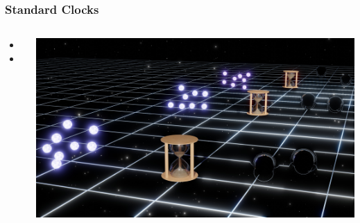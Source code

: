 \documentclass[aspectratio=169]{beamer}
\begin{document}
\begin{frame}
    \frametitle{Standard Clocks}
    \begin{columns}
        \begin{itemize}
            \item <+Cosmic Chronometers+>
            \item <+Pulsar timing arrays+>
        \end{itemize}
        \includegraphics[width=\textwidth]{figures/timers.jpg}
    \end{columns}
\end{frame}
 
\end{document}
